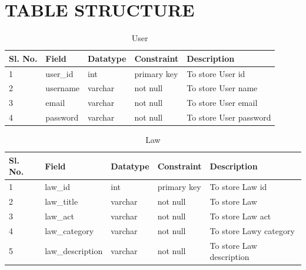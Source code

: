 \chapter{TABLE STRUCTURE}
\begin{table}[h]
   \centering
    \begin{tabular}{|l|l|l|l|l|}
    \hline 
    Sl. No.&  Field&  Datatype&  Constraint& Description \\
     \hline  
      1& user\_id &int  &primary key  &To store User id \\ 
      \hline 
      2&username  &varchar  &not null  &To store User name  \\
      \hline 
        3& email &varchar  &not null  &To store User email \\
   \hline
        4& password &varchar  &not null  &To store User password \\

\hline
    \end{tabular}
\caption{User}
\label{tab:User}
\end{table}
\begin{table}[h]
   \centering
    \begin{tabular}{|l|l|l|l|l|}
    \hline 
    Sl. No.&  Field&  Datatype&  Constraint& Description \\
     \hline  
      1& law\_id &int  &primary key  &To store Law id \\ 
      \hline 
      2&law\_title  &varchar  &not null  &To store Law  \\
      \hline 
        3& law\_act &varchar  &not null  &To store Law act \\
   \hline 
        4& law\_category &varchar  &not null  &To store Lawy category \\
   \hline
        5& law\_description &varchar  &not null  &To store Law description \\


\hline
    \end{tabular}
\caption{Law }
\label{tab:Law}
\end{table}
